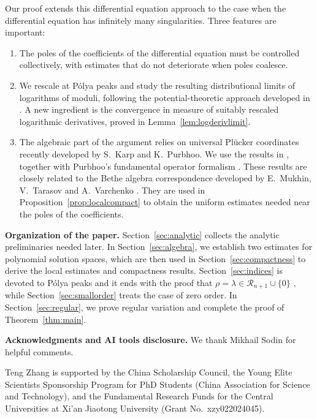 \documentclass[12pt,letterpaper,reqno]{amsart}
\theoremstyle{definition}
\numberwithin{equation}{section}
\begin{document}
Our proof extends this differential equation approach to the case
when the differential equation has infinitely many singularities. 
Three features are important:
\begin{enumerate}[label=(\arabic*)]
\item
The poles of the coefficients of the differential equation
must be controlled collectively,
with estimates that do not deteriorate when poles coalesce.

\item
We rescale at P\'olya peaks and study the resulting distributional limits
of logarithms of moduli, following the potential-theoretic approach
developed in
\cite{Ere89a,Ere89b,ES91,ES92,Ere93}. A new ingredient is the
convergence in measure of suitably rescaled logarithmic derivatives,
proved in Lemma~\ref{lem:logderivlimit}.

\item
The algebraic part of the argument relies on universal Pl\"ucker
coordinates recently developed by S.~Karp and K.~Purbhoo.
We use the results in \cite{KP26},
together with Purbhoo's fundamental operator formalism
\cite[Proposition~2.2]{Pur23}. These results are closely related
to the Bethe algebra correspondence developed by
E.~Mukhin, V.~Tarasov and A.~Varchenko \cite{MTV13}. They are used in
Proposition~\ref{prop:localcompact} to obtain the uniform estimates needed
near the poles of the coefficients.
\end{enumerate}


\medskip
\noindent\textbf{Organization of the paper.}
Section~\ref{sec:analytic} collects the analytic preliminaries needed later.
In Section~\ref{sec:algebra}, we establish two estimates for polynomial
solution spaces, which are then used in Section~\ref{sec:compactness} to
derive the local estimates and compactness results. Section~\ref{sec:indices}
is devoted to P\'olya peaks and it ends with the proof that
$\rho=\lambda\in\mathcal R_{n+1}\cup\{0\}$ , while
Section~\ref{sec:smallorder} treats the case of zero order.
In Section~\ref{sec:regular}, we prove regular variation and complete the
proof of Theorem~\ref{thm:main}. %


\medskip
\noindent\textbf{Acknowledgments and AI tools disclosure.}
We thank Mikhail Sodin for helpful comments.

Teng Zhang is supported by the China Scholarship Council, the Young Elite
Scientists Sponsorship Program for PhD Students (China Association for Science
and Technology), and the Fundamental Research Funds for the Central
Universities at Xi'an Jiaotong University (Grant No.~xzy022024045).
\end{document}
